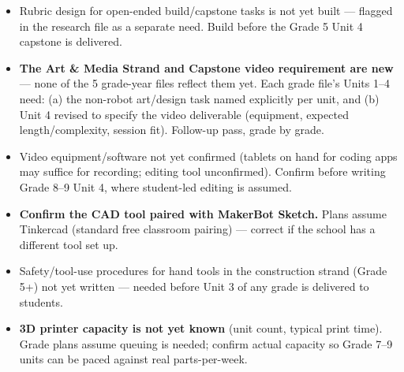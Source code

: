 \documentclass[10pt, a4paper]{article}
\begin{document}
\begin{itemize}
\item Rubric design for open-ended build/capstone tasks is not yet built --- flagged in the research file as a separate need. Build before the Grade 5 Unit 4 capstone is delivered.
\item \textbf{The Art \& Media Strand and Capstone video requirement are new} --- none of the 5 grade-year files reflect them yet. Each grade file's Units 1--4 need: (a) the non-robot art/design task named explicitly per unit, and (b) Unit 4 revised to specify the video deliverable (equipment, expected length/complexity, session fit). Follow-up pass, grade by grade.
\item Video equipment/software not yet confirmed (tablets on hand for coding apps may suffice for recording; editing tool unconfirmed). Confirm before writing Grade 8--9 Unit 4, where student-led editing is assumed.
\item \textbf{Confirm the CAD tool paired with MakerBot Sketch.} Plans assume Tinkercad (standard free classroom pairing) --- correct if the school has a different tool set up.
\item Safety/tool-use procedures for hand tools in the construction strand (Grade 5+) not yet written --- needed before Unit 3 of any grade is delivered to students.
\item \textbf{3D printer capacity is not yet known} (unit count, typical print time). Grade plans assume queuing is needed; confirm actual capacity so Grade 7--9 units can be paced against real parts-per-week.
\end{itemize}
\end{document}
